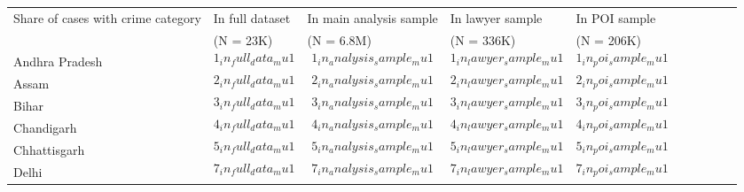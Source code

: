 {
\begin{tabular}{>{\centering\arraybackslash}m{4cm}>{\centering\arraybackslash}m{2.6cm}>{\centering\arraybackslash}m{2.6cm}>{\centering\arraybackslash}m{2.6cm}>{\centering\arraybackslash}m{2.6cm}>{\centering\arraybackslash}m{2.6cm}>{\centering\arraybackslash}m{2.6cm}>{\centering\arraybackslash}m{2.6cm}>{\centering\arraybackslash}m{2.6cm}>{\centering\arraybackslash}m{2.6cm}}
 
\hline \hline

\vspace{0.14cm}
Share of cases with crime category & In full dataset & In main analysis sample & In lawyer sample  & In POI sample \\

& (N = 23K) & (N = 6.8M) & (N = 336K) & (N = 206K) \\

\hline
\vspace{0.14cm}

Andhra Pradesh & $$1_in_full_data_mu1$$  & $$1_in_analysis_sample_mu1$$ &  $$1_in_lawyer_sample_mu1$$ & $$1_in_poi_sample_mu1$$ \\

\vspace{0.14cm}

Assam &  $$2_in_full_data_mu1$$  & $$2_in_analysis_sample_mu1$$ &  $$2_in_lawyer_sample_mu1$$ & $$2_in_poi_sample_mu1$$ \\

\vspace{0.14cm}

Bihar & $$3_in_full_data_mu1$$  & $$3_in_analysis_sample_mu1$$ &  $$3_in_lawyer_sample_mu1$$ & $$3_in_poi_sample_mu1$$ \\

\vspace{0.14cm}

Chandigarh & $$4_in_full_data_mu1$$  & $$4_in_analysis_sample_mu1$$ &  $$4_in_lawyer_sample_mu1$$ & $$4_in_poi_sample_mu1$$ \\

\vspace{0.14cm}

Chhattisgarh & $$5_in_full_data_mu1$$  & $$5_in_analysis_sample_mu1$$ &  $$5_in_lawyer_sample_mu1$$ & $$5_in_poi_sample_mu1$$ \\

\vspace{0.14cm}

Delhi & $$7_in_full_data_mu1$$  & $$7_in_analysis_sample_mu1$$ &  $$7_in_lawyer_sample_mu1$$ & $$7_in_poi_sample_mu1$$ \\


\end{tabular}}
